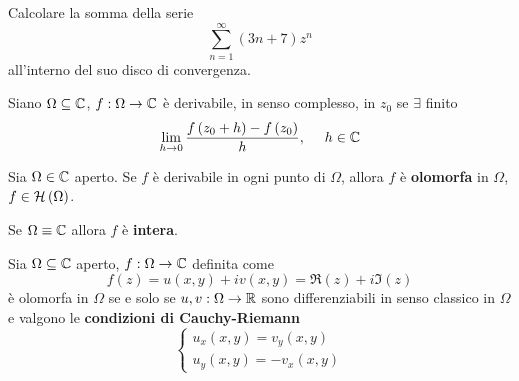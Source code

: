 Calcolare la somma della serie
\begin{equation*}
\sum\limits ^{\infty }_{n=1}\left( 3n+7\right) z^{n}
\end{equation*}
all'interno del suo disco di convergenza.
\ParteSoluzioni
\Soluzione
\begin{defn}
Siano $\Omega \subseteq \mathbb{C} $, $f:\Omega \rightarrow \mathbb{C} $ è derivabile, in senso complesso, in $z_{0}$ se $\exists $ finito
\begin{equation*}
\lim\limits _{h\rightarrow 0}\frac{f\left( z_{0} +h\right) -f\left( z_{0}\right)}{h} ,\ \ \ \ h\in \mathbb{C} 
\end{equation*}
\end{defn}
\begin{defn}
Sia $\Omega \in \mathbb{C} $ aperto. Se $f$ è derivabile in ogni punto di $\Omega $, allora $f$ è \textbf{olomorfa} in $\Omega $, $f\in \mathcal{H} \left( \Omega \right)$.
\end{defn}
\begin{rem}
Se $\Omega \equiv \mathbb{C} $ allora $f$ è \textbf{intera}.
\end{rem}
\begin{thm}
 Sia $\Omega \subseteq \mathbb{C} $ aperto, $f:\Omega \rightarrow \mathbb{C} $ definita come
\begin{equation*}
f\left( z\right) =u\left( x,y\right) +iv\left( x,y\right) =\Re \left( z\right) +i\Im \left( z\right)
\end{equation*}
è olomorfa in $\Omega $ se e solo se $u,v:\Omega \rightarrow \mathbb{R} $ sono differenziabili in senso classico in $\Omega $ e valgono le \textbf{condizioni di Cauchy-Riemann}
\begin{equation}
\begin{cases}
u_{x}\left( x,y\right) =v_{y}\left( x,y\right)\\
u_{y}\left( x,y\right) =-v_{x}\left( x,y\right)
\end{cases}
\end{equation}
\end{thm}
